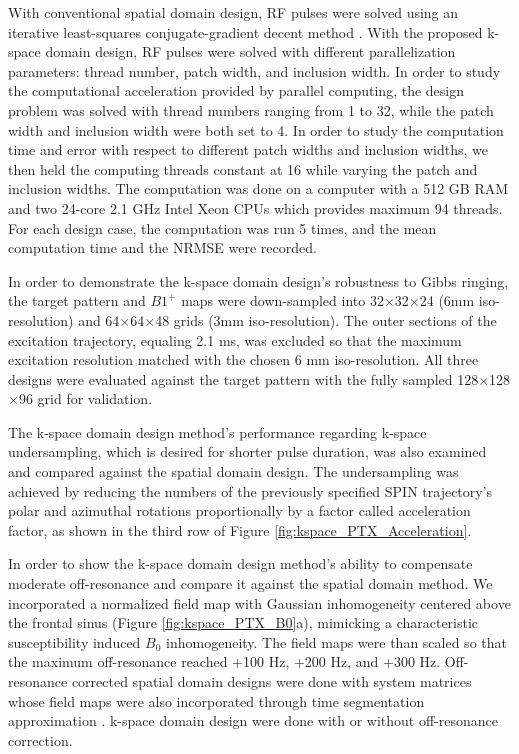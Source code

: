 With conventional spatial domain design, RF pulses were solved using an iterative least-squares conjugate-gradient decent method \cite{Grissom:2006:MRM}. With the proposed k-space domain design, RF pulses were solved with different parallelization parameters: thread number, patch width, and inclusion width. In order to study the computational acceleration provided by parallel computing, the design problem was solved with thread numbers ranging from 1 to 32, while the patch width and inclusion width were both set to 4. In order to study the computation time and error with respect to different patch widths and inclusion widths, we then held the computing threads constant at 16 while varying the patch and inclusion widths. The computation was done on a computer with a 512 GB RAM and two 24-core 2.1 GHz Intel Xeon CPUs which provides maximum 94 threads. For each design case, the computation was run 5 times, and the mean computation time and the NRMSE were recorded.

In order to demonstrate the k-space domain design’s robustness to Gibbs ringing, the target pattern and $B1^+$ maps were down-sampled into 32$\times$32$\times$24 (6mm iso-resolution)  and 64$\times$64$\times$48 grids (3mm iso-resolution). The outer sections of the excitation trajectory, equaling 2.1 ms, was excluded so that the maximum excitation resolution matched with the chosen 6 mm iso-resolution. All three designs were evaluated against the target pattern with the fully sampled 128$\times$128$\times$96 grid for validation.

The k-space domain design method's performance regarding k-space undersampling, which is desired for shorter pulse duration, was also examined and compared against the spatial domain design. The undersampling was achieved by reducing the numbers of the previously specified SPIN trajectory's polar and azimuthal rotations proportionally by a factor called acceleration factor, as shown in the third row of Figure \ref{fig:kspace_PTX_Acceleration}.    

In order to show the k-space domain design method's ability to compensate moderate off-resonance and compare it against the spatial domain method. We incorporated a normalized field map with Gaussian inhomogeneity centered above the frontal sinus (Figure \ref{fig:kspace_PTX_B0}a), mimicking a characteristic susceptibility induced $B_0$ inhomogeneity. The field maps were than scaled so that the maximum off-resonance reached +100 Hz, +200 Hz, and +300 Hz. Off-resonance corrected spatial domain designs were done with system matrices whose field maps were also incorporated through time segmentation approximation \cite{fessler2005toeplitz}. k-space domain design were done with or without off-resonance correction.